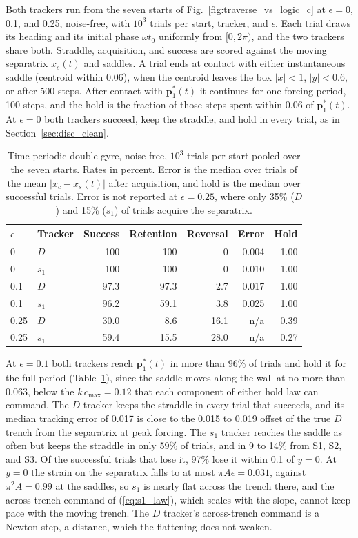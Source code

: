 \documentclass[11pt]{article}
\begin{document}
Both trackers run from the seven starts of
Fig.~\ref{fig:traverse_vs_logic_c} at $\epsilon = 0$, 0.1, and 0.25,
noise-free, with $10^3$ trials per start, tracker, and $\epsilon$. Each
trial draws its heading and its initial phase $\omega t_0$ uniformly from
$[0, 2\pi)$, and the two trackers share both. Straddle, acquisition, and
success are scored against the moving separatrix $x_s(t)$ and saddles. A
trial ends at contact with either instantaneous saddle (centroid within
0.06), when the centroid leaves the box $|x| < 1$, $|y| < 0.6$, or after
500 steps. After contact with $\mathbf{p}^*_1(t)$ it continues for one
forcing period, 100 steps, and the hold is the fraction of those steps
spent within 0.06 of $\mathbf{p}^*_1(t)$. At $\epsilon = 0$ both trackers
succeed, keep the straddle, and hold in every trial, as in
Section~\ref{sec:disc_clean}.

\begin{table}[H]
\centering
\caption{Time-periodic double gyre, noise-free, $10^3$ trials per start
pooled over the seven starts. Rates in percent. Error is the median over
trials of the mean $|x_c - x_s(t)|$ after acquisition, and hold is the
median over successful trials. Error is not reported at
$\epsilon = 0.25$, where only 35\% ($D$) and 15\% ($s_1$) of trials
acquire the separatrix.}
\label{tab:unsteady}
\begin{tabular}{llrrrrr}
\toprule
$\epsilon$ & Tracker & Success & Retention & Reversal & Error & Hold \\
\midrule
0    & $D$   & 100  & 100  & 0    & 0.004 & 1.00 \\
0    & $s_1$ & 100  & 100  & 0    & 0.010 & 1.00 \\
0.1  & $D$   & 97.3 & 97.3 & 2.7  & 0.017 & 1.00 \\
0.1  & $s_1$ & 96.2 & 59.1 & 3.8  & 0.025 & 1.00 \\
0.25 & $D$   & 30.0 & 8.6  & 16.1 & n/a   & 0.39 \\
0.25 & $s_1$ & 59.4 & 15.5 & 28.0 & n/a   & 0.27 \\
\bottomrule
\end{tabular}
\end{table}

At $\epsilon = 0.1$ both trackers reach $\mathbf{p}^*_1(t)$ in more than
96\% of trials and hold it for the full period
(Table~\ref{tab:unsteady}), since the saddle moves along the wall at no
more than 0.063, below the $k\,c_{\max} = 0.12$ that each component of
either hold law can command. The $D$ tracker keeps the straddle in every
trial that succeeds, and its median tracking error of 0.017 is close to
the 0.015 to 0.019 offset of the true $D$ trench from the separatrix at
peak forcing. The $s_1$ tracker reaches the saddle as often but keeps the
straddle in only 59\% of trials, and in 9 to 14\% from S1, S2, and S3. Of
the successful trials that lose it, 97\% lose it within 0.1 of $y = 0$.
At $y = 0$ the strain on the separatrix falls to at most
$\pi A\epsilon = 0.031$, against $\pi^2 A = 0.99$ at the saddles, so $s_1$
is nearly flat across the trench there, and the across-trench command of
(\ref{eq:s1_law}), which scales with the slope, cannot keep pace with the
moving trench. The $D$ tracker's across-trench command is a Newton step,
a distance, which the flattening does not weaken.
\end{document}
